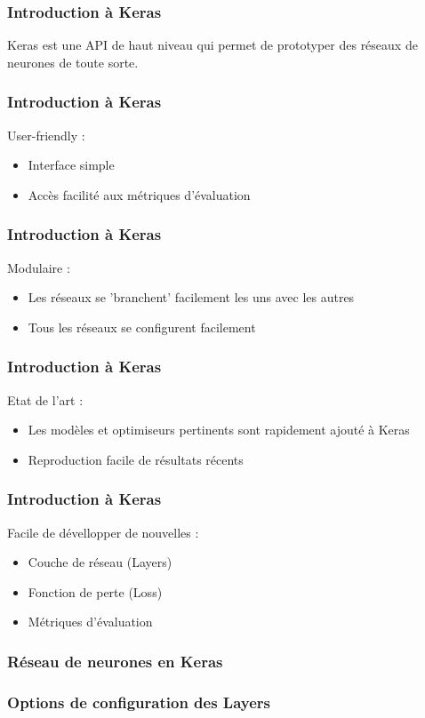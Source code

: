 \begin{frame}
  \frametitle{Introduction à Keras}
  Keras est une API de haut niveau qui permet de prototyper des réseaux de neurones de toute sorte.
\end{frame}

\begin{frame}
  \frametitle{Introduction à Keras}
  User-friendly :
  \begin{itemize}
  \item Interface simple
  \item Accès facilité aux métriques d'évaluation
  \end{itemize}
\end{frame}

\begin{frame}
  \frametitle{Introduction à Keras}
  Modulaire :
  \begin{itemize}
  \item Les réseaux se 'branchent' facilement les uns avec les autres
  \item Tous les réseaux se configurent facilement
  \end{itemize}
\end{frame}

\begin{frame}
  \frametitle{Introduction à Keras}
  Etat de l'art :
  \begin{itemize}
  \item Les modèles et optimiseurs pertinents sont rapidement ajouté à Keras
  \item Reproduction facile de résultats récents
  \end{itemize}
\end{frame}

\begin{frame}
  \frametitle{Introduction à Keras}
  Facile de dévellopper de nouvelles :
  \begin{itemize}
  \item Couche de réseau (Layers)
  \item Fonction de perte (Loss)
  \item Métriques d'évaluation
  \end{itemize}
\end{frame}

\begin{frame}
  \frametitle{Réseau de neurones en Keras}
\end{frame}

\begin{frame}
  \frametitle{Options de configuration des Layers}
\end{frame}

